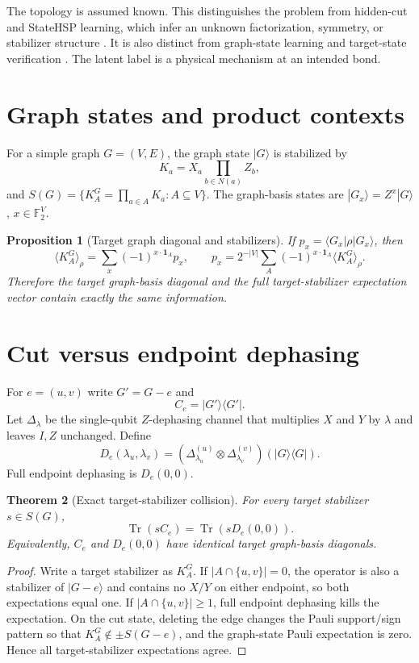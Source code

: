 \documentclass[11pt]{article}
\newtheorem{theorem}{Theorem}[section]
\newtheorem{proposition}[theorem]{Proposition}
\newcommand{\F}{\mathbb F}
\begin{document}
The topology is assumed known. This distinguishes the problem from hidden-cut and StateHSP learning, which infer an unknown factorization, symmetry, or stabilizer structure \cite{BGW,HEC}. It is also distinct from graph-state learning and target-state verification \cite{OT,PLM,DHZ}. The latent label is a physical mechanism at an intended bond.

\section{Graph states and product contexts}
For a simple graph $G=(V,E)$, the graph state $|G\rangle$ is stabilized by
\[
K_a=X_a\prod_{b\in N(a)}Z_b,
\]
and $S(G)=\{K_A^G=\prod_{a\in A}K_a:A\subseteq V\}$. The graph-basis states are $|G_x\rangle=Z^x|G\rangle$, $x\in\F_2^V$.

\begin{proposition}[Target graph diagonal and stabilizers]
If $p_x=\langle G_x|\rho|G_x\rangle$, then
\[
\langle K_A^G\rangle_\rho=\sum_x(-1)^{x\cdot\mathbf1_A}p_x,
\qquad
p_x=2^{-|V|}\sum_A(-1)^{x\cdot\mathbf1_A}\langle K_A^G\rangle_\rho.
\]
Therefore the target graph-basis diagonal and the full target-stabilizer expectation vector contain exactly the same information.
\end{proposition}

\section{Cut versus endpoint dephasing}
For $e=(u,v)$ write $G'=G-e$ and
\[
C_e=|G'\rangle\!\langle G'|.
\]
Let $\Delta_\lambda$ be the single-qubit $Z$-dephasing channel that multiplies $X$ and $Y$ by $\lambda$ and leaves $I,Z$ unchanged. Define
\[
D_e(\lambda_u,\lambda_v)=
(\Delta_{\lambda_u}^{(u)}\otimes\Delta_{\lambda_v}^{(v)})(|G\rangle\!\langle G|).
\]
Full endpoint dephasing is $D_e(0,0)$.

\begin{theorem}[Exact target-stabilizer collision]
For every target stabilizer $s\in S(G)$,
\[
\operatorname{Tr}(sC_e)=\operatorname{Tr}(sD_e(0,0)).
\]
Equivalently, $C_e$ and $D_e(0,0)$ have identical target graph-basis diagonals.
\end{theorem}
\begin{proof}
Write a target stabilizer as $K_A^G$. If $|A\cap\{u,v\}|=0$, the operator is also a stabilizer of $|G-e\rangle$ and contains no $X/Y$ on either endpoint, so both expectations equal one. If $|A\cap\{u,v\}|\ge1$, full endpoint dephasing kills the expectation. On the cut state, deleting the edge changes the Pauli support/sign pattern so that $K_A^G\notin\pm S(G-e)$, and the graph-state Pauli expectation is zero. Hence all target-stabilizer expectations agree.
\end{proof}
\end{document}
